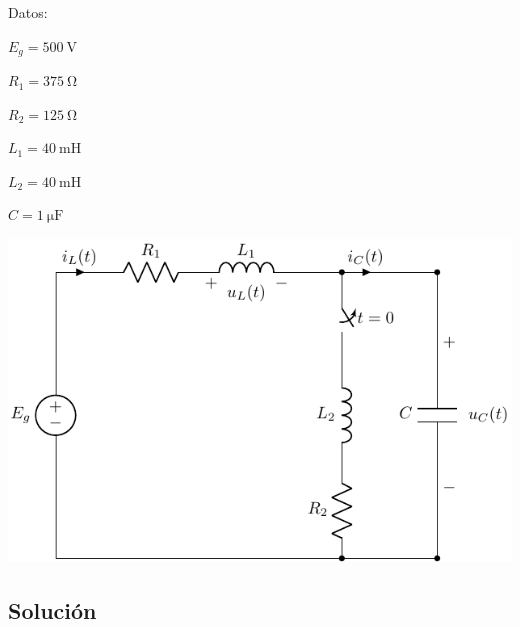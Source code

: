\begin{minipage}{0.3\linewidth}
  Datos:

  $E_g = \SI{500}{\volt}$

  $R_{1}= \SI{375}{\ohm}$%

  $R_{2}=\SI{125}{\ohm}$%

  $L_1 = \SI{40}{\milli\henry}$%

  $L_2 = \SI{40}{\milli\henry}$%

  $C = \SI{1}{\micro\farad}$%
\end{minipage}
\begin{minipage}{0.7\linewidth}
  \includegraphics{figuras/E1_RLC.pdf}
\end{minipage}

\subsection*{Solución}

